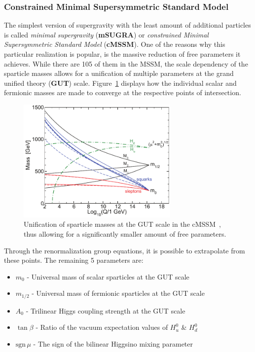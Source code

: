 \subsubsection{Constrained Minimal Supersymmetric Standard Model}

The simplest version of supergravity with the least amount of additional particles is called \textit{minimal supergravity} (\textbf{mSUGRA}) or \textit{constrained Minimal Supersymmetric Standard Model} (\textbf{cMSSM}). One of the reasons why this particular realization is popular, is the massive reduction of free parameters it achieves. While there are 105 of them in the MSSM, the scale dependency of the sparticle masses allows for a unification of multiple parameters at the grand unified theory (\textbf{GUT}) scale. Figure~\ref{fig:msugrarge} displays how the individual scalar and fermionic masses are made to converge at the respective points of intersection.

\begin{figure}[ht!]
  \centering
  \includegraphics[width=0.7\textwidth]{plots/msugrarge.pdf}
  \caption{Unification of sparticle masses at the GUT scale in the cMSSM~\cite{susyprimer}, thus allowing for a significantly smaller amount of free parameters.}
  \label{fig:msugrarge}
\end{figure}

\noindent Through the renormalization group equations, it is possible to extrapolate from these points. The remaining 5 parameters are:

\begin{itemize}
\item $m_0$ - Universal mass of scalar sparticles at the GUT scale
\item $m_{1/2}$ - Universal mass of fermionic sparticles at the GUT scale
\item $A_0$ - Trilinear Higgs coupling strength at the GUT scale
\item $\tan{\beta}$ - Ratio of the vacuum expectation values of $H^0_u$ \& $H^0_d$
\item $\text{sgn}\,\mu$ - The sign of the bilinear Higgsino mixing parameter
\end{itemize}


